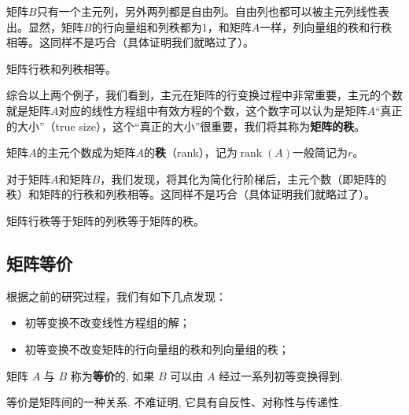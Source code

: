 矩阵$B$只有一个主元列，另外两列都是自由列。自由列也都可以被主元列线性表出。显然，矩阵$B$的行向量组和列秩都为1，和矩阵$A$一样，列向量组的秩和行秩相等。这同样不是巧合（具体证明我们就略过了）。

\begin{theorem}
    矩阵行秩和列秩相等。
\end{theorem}

综合以上两个例子，我们看到，主元在矩阵的行变换过程中非常重要，主元的个数就是矩阵$A$对应的线性方程组中有效方程的个数，这个数字可以认为是矩阵$A$“真正的大小”（true size），这个“真正的大小”很重要，我们将其称为\textbf{矩阵的秩}。

\begin{definition}
    矩阵$A$的主元个数成为矩阵$A$的\textcolor{third}{\bf 秩}（rank），记为$\operatorname{\operatorname{rank}}(A)$一般简记为$r$。
\end{definition}

对于矩阵$A$和矩阵$B$，我们发现，将其化为简化行阶梯后，主元个数（即矩阵的秩）和矩阵的行秩和列秩相等。这同样不是巧合（具体证明我们就略过了）。

\begin{theorem}
    矩阵行秩等于矩阵的列秩等于矩阵的秩。
\end{theorem}

\subsection{矩阵等价}
\label{subsec:矩阵等价}

根据之前的研究过程，我们有如下几点发现：

\begin{itemize}
    \item 初等变换不改变线性方程组的解；
    \item 初等变换不改变矩阵的行向量组的秩和列向量组的秩；
\end{itemize}

\begin{definition}[矩阵等价]
    矩阵 $A$ 与 $B$ 称为\textcolor{third}{\bf 等价}的, 如果 $B$ 可以由 $A$ 经过一系列初等变换得到.
\end{definition}

等价是矩阵间的一种关系. 不难证明, 它具有自反性、对称性与传递性.

